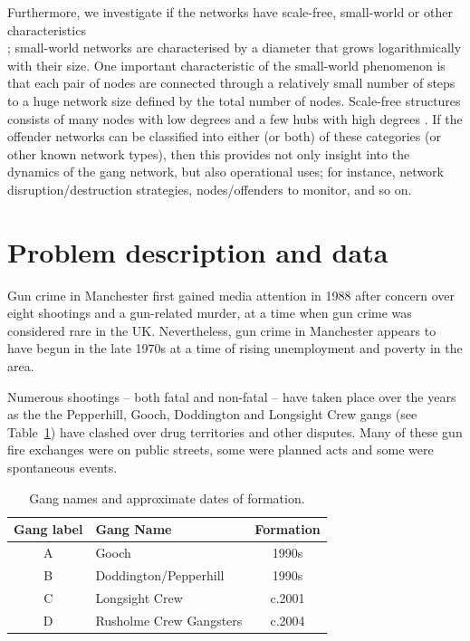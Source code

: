 \documentclass[twocolumn]{svjour3}          %
\theoremstyle{definition}
\begin{document}
Furthermore, we investigate if the networks have scale-free,
small-world or other characteristics\\
\citep{Watts1999,AlbertBarabasi2002,Newman2003}; small-world networks
are characterised by a diameter that grows logarithmically with their
size. One important characteristic of the small-world phenomenon is
that each pair of nodes are connected through a relatively small
number of steps to a huge network size defined by the total number of
nodes. Scale-free structures consists of many nodes with low degrees
and a few hubs with high degrees
\citep{AlbAlbNak04,CostaRodriguesTraviesoVillasBoas2007,Jackson2008}. If
the offender networks can be classified into either (or both) of these
categories (or other known network types), then this provides not only
insight into the dynamics of the gang network, but also operational
uses; for instance, network disruption/destruction strategies,
nodes/offenders to monitor, and so on.


\section{Problem description and data}\label{sec:problemdescription}

Gun crime in Manchester first gained media attention in 1988 after
concern over eight shootings and a gun-related murder, at a time when
gun crime was considered rare in the UK. Nevertheless, gun crime in
Manchester appears to have begun in the late 1970s at a time of rising
unemployment and poverty in the area.

Numerous shootings -- both fatal and non-fatal -- have taken place
over the years as the the Pepperhill, Gooch, Doddington and Longsight
Crew gangs (see Table~\ref{table:gangnames}) have clashed over drug
territories and other disputes. Many of these gun fire exchanges were
on public streets, some were planned acts and some were spontaneous
events.

\begin{table}[htb]
\centering
\begin{tabularx}{\columnwidth}{c X c}
\hline
Gang label & Gang Name & Formation  \\ %
\hline
A & Gooch & 1990s\\
B & Doddington/Pepperhill & 1990s\\
C & Longsight Crew &  c.2001\\
D & Rusholme Crew Gangsters & c.2004\\ %
\hline
\end{tabularx}
\caption{Gang names and approximate dates of formation.}
\label{table:gangnames}
\end{table}
\end{document}
